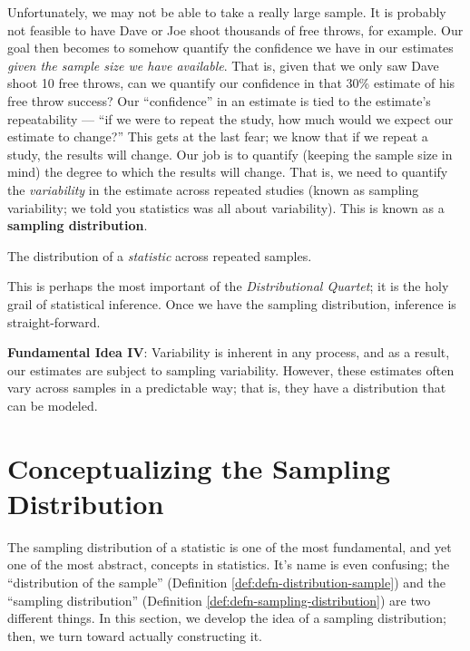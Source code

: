 \documentclass[]{book}
\theoremstyle{definition}
\theoremstyle{definition}
\theoremstyle{definition}
\theoremstyle{remark}
\let\BeginKnitrBlock\begin \let\EndKnitrBlock\end
\begin{document}
Unfortunately, we may not be able to take a really large sample. It is
probably not feasible to have Dave or Joe shoot thousands of free
throws, for example. Our goal then becomes to somehow quantify the
confidence we have in our estimates \emph{given the sample size we have
available}. That is, given that we only saw Dave shoot 10 free throws,
can we quantify our confidence in that 30\% estimate of his free throw
success? Our ``confidence'' in an estimate is tied to the estimate's
repeatability --- ``if we were to repeat the study, how much would we
expect our estimate to change?'' This gets at the last fear; we know
that if we repeat a study, the results will change. Our job is to
quantify (keeping the sample size in mind) the degree to which the
results will change. That is, we need to quantify the \emph{variability}
in the estimate across repeated studies (known as sampling variability;
we told you statistics was all about variability). This is known as a
\textbf{sampling distribution}.

\BeginKnitrBlock{definition}[Sampling Distribution]
\protect\hypertarget{def:defn-sampling-distribution}{}{\label{def:defn-sampling-distribution}
{} }The distribution of a
\emph{statistic} across repeated samples.
\EndKnitrBlock{definition}

This is perhaps the most important of the \emph{Distributional Quartet};
it is the holy grail of statistical inference. Once we have the sampling
distribution, inference is straight-forward.

\BeginKnitrBlock{rmdfivefund}
\textbf{Fundamental Idea IV}: Variability is inherent in any process,
and as a result, our estimates are subject to sampling variability.
However, these estimates often vary across samples in a predictable way;
that is, they have a distribution that can be modeled.
\EndKnitrBlock{rmdfivefund}

\section{Conceptualizing the Sampling
Distribution}\label{conceptualizing-the-sampling-distribution}

The sampling distribution of a statistic is one of the most fundamental,
and yet one of the most abstract, concepts in statistics. It's name is
even confusing; the ``distribution of the sample'' (Definition
\ref{def:defn-distribution-sample}) and the ``sampling distribution''
(Definition \ref{def:defn-sampling-distribution}) are two different
things. In this section, we develop the idea of a sampling distribution;
then, we turn toward actually constructing it.
\end{document}
